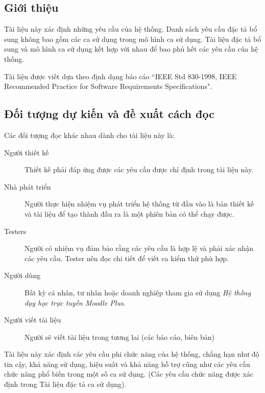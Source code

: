 \documentclass[./../main_file.tex]{subfiles}
\begin{document}
	\subsection{Giới thiệu}
	
	Tài liệu này xác định những yêu cầu của hệ thống. Danh sách yêu cầu đặc tả bổ sung không bao gồm các ca sử dụng trong mô hình ca sử dụng. Tài liệu đặc tả bổ sung và mô hình ca sử dụng kết hợp với nhau để bao phủ hết các yêu cầu của hệ thống.
	
	Tài liệu được viết dựa theo định dạng báo cáo “IEEE Std 830-1998, IEEE Recommended Practice for Software Requirements Specifications".
	
	\subsection{Đối tượng dự kiến và đề xuất cách đọc}
	
	Các đối tượng đọc khác nhau dành cho tài liệu này là:
	
	\begin{description}
		\item[Người thiết kế] Thiết kế phải đáp ứng được các yêu cầu được chỉ định trong tài liệu này.
		
		\item[Nhà phát triển] Người thực hiện nhiệm vụ phát triển hệ thống từ đầu vào là bản thiết kế và tài liệu để tạo thành đầu ra là một phiên bản có thể chạy được.
		
		\item[Testers] Người có nhiệm vụ đảm bảo rằng các yêu cầu là hợp lệ và phải xác nhận các yêu cầu. Tester nên đọc chi tiết để viết ca kiểm thử phù hợp.
		
		\item[Người dùng] Bất kỳ cá nhân, tư nhân hoặc doanh nghiệp tham gia sử dụng \emph{Hệ thống dạy học trực tuyến Moodle Plus}.
		
		\item[Người viết tài liệu] Người sẽ viết tài liệu trong tương lai (các báo cáo, biên bản)
	\end{description}

	Tài liệu này xác định các yêu cầu phi chức năng của hệ thống, chẳng hạn như độ tin cậy, khả năng sử dụng, hiệu suất và khả năng hỗ trợ cũng như các yêu cầu chức năng phổ biến trong một số ca sử dụng. (Các yêu cầu chức năng được xác định trong Tài liệu đặc tả ca sử dụng).
	
\end{document}
